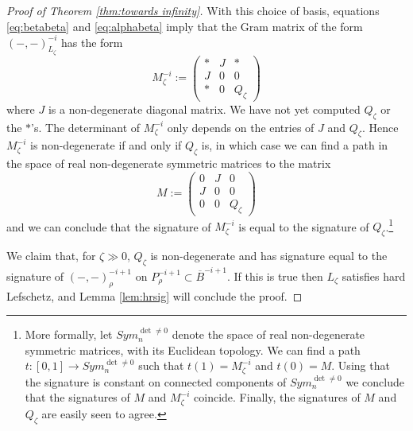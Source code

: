 \documentclass[11pt]{amsart}
\numberwithin{equation}{section}
\def\z{\zeta}
\def\ov{\overline}
\def\to{\rightarrow}
\theoremstyle{definition}
\theoremstyle{remark}
\begin{document}
\begin{proof}[Proof of Theorem \ref{thm:towards infinity}]
With this choice of basis, equations \eqref{eq:betabeta} and \eqref{eq:alphabeta} imply that the
Gram matrix of the form $( -, - )^{-i}_{L_\z}$ has the form
\[
M^{-i}_\z := \left ( \begin{array}{ccc}
* & J & * \\
J & 0 & 0 \\
* & 0 & Q_\z \end{array} \right )
\]
where $J$ is a non-degenerate diagonal matrix. We have not yet
computed $Q_\z$ or the $*$'s. The determinant of $M^{-i}_\z$ only
depends on the entries of $J$ and $Q_\z$. Hence $M^{-i}_\z$ is
non-degenerate if and only if 
$Q_\z$ is, in which case we can find a path in the space of
real non-degenerate symmetric matrices to the matrix
\[
M := \left ( \begin{array}{ccc}
0 & J & 0 \\
J & 0 & 0 \\
0 & 0 & Q_\z \end{array} \right )
\]
and we can conclude that the signature of $M^{-i}_\z$ is equal to the
signature of $Q_\z$.\footnote{More formally, let $Sym_n^{\det \ne 0}$
  denote the space of real non-degenerate symmetric matrices, with its
  Euclidean topology. We can find a path $t : [0,1] \to
  Sym_n^{\det \ne 0}$ such that $t(1) = M^{-i}_\z$ and $t(0) = M$. Using
  that the signature is constant on connected components of
  $Sym_n^{\det \ne 0}$ we conclude that the signatures of $M$ and
  $M^{-i}_\z$ coincide. Finally, the signatures of $M$ and $Q_\z$ are
  easily seen to agree.}

We claim that, for $\z \gg 0$, $Q_\z$ is non-degenerate and has
signature equal to the signature of $(-,-)^{-i+1}_\rho$ on
$P^{-i+1}_\rho \subset \ov{B}^{-i+1}$. If this is true then $L_{\z}$
satisfies hard Lefschetz, and Lemma \ref{lem:hrsig} will conclude the proof.


\end{proof}
\end{document}

